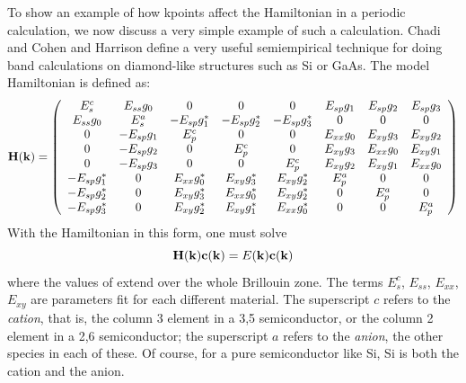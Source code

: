 To show an example of how kpoints affect the Hamiltonian in a periodic
calculation, we now discuss a very simple example of such a
calculation. 
Chadi and Cohen \cite{Chadi75} and Harrison \cite{Harrison80} define a
very useful semiempirical technique for doing band calculations on
diamond-like structures such as Si or GaAs. The model Hamiltonian is
defined as:
\begin{equation}
\mathbf{H}(\mathbf{k})=\left(
\begin{array}{cccccccc}
E_s^c & E_{ss}g_0 & 0 & 0 & 0 & E_{sp}g_1 & E_{sp}g_2 & E_{sp}g_3 \\
E_{ss}g_0 & E_s^a & -E_{sp}g_1^* & -E_{sp}g_2^* & -E_{sp}g_3^* &
  0 & 0 & 0\\
0 & -E_{sp}g_1 & E_p^c & 0 & 0 & E_{xx}g_0 &E_{xy}g_3 &E_{xy}g_2 \\
0 & -E_{sp}g_2 & 0 & E_p^c & 0 & E_{xy}g_3 &E_{xx}g_0 &E_{xy}g_1 \\
0 & -E_{sp}g_3 & 0 & 0 & E_p^c & E_{xy}g_2 &E_{xy}g_1 &E_{xx}g_0 \\
-E_{sp}g_1^* & 0 & E_{xx}g_0^* & E_{xy}g_3^* &E_{xy}g_2^*&
   E_p^a & 0 & 0 \\
-E_{sp}g_2^* & 0 & E_{xy}g_3^* & E_{xx}g_0^* &E_{xy}g_2^*&
   0 & E_p^a & 0 \\
-E_{sp}g_3^* & 0 & E_{xy}g_2^* & E_{xy}g_1^* &E_{xx}g_0^*&
   0 & 0 &E_p^a 
\end{array}
\right)
\label{harrison-ham}
\end{equation}
With the Hamiltonian in this form, one must solve
\begin{equation}
\mathbf{H}(\mathbf{k})\mathbf{c}(\mathbf{k}) 
  = E(\mathbf{k})\mathbf{c}(\mathbf{k})
\end{equation}
where the values of  extend over the whole Brillouin zone.
The terms $E_s^c$, $E_{ss}$, $E_{xx}$, $E_{xy}$ are parameters
fit for each different material. The superscript $c$ refers to the
\emph{cation}, that is, the column 3 element in a 3,5 semiconductor,
or the column 2 element in a 2,6 semiconductor; the superscript $a$
refers to the \emph{anion}, the other species in each of these. Of
course, for a pure semiconductor like Si, Si is both the cation and
the anion.

